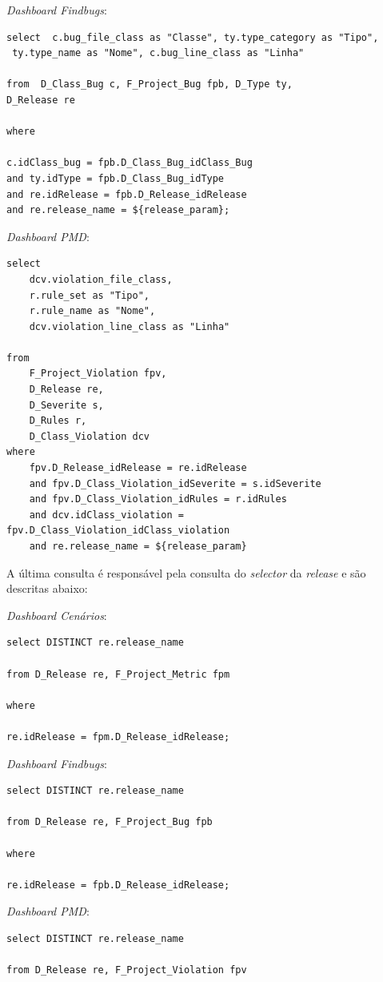 \begin{apendicesenv}
\textit{Dashboard Findbugs}:
{\color{blue}
\begin{verbatim}
select  c.bug_file_class as "Classe", ty.type_category as "Tipo",
 ty.type_name as "Nome", c.bug_line_class as "Linha"

from  D_Class_Bug c, F_Project_Bug fpb, D_Type ty, 
D_Release re

where

c.idClass_bug = fpb.D_Class_Bug_idClass_Bug 
and ty.idType = fpb.D_Class_Bug_idType 
and re.idRelease = fpb.D_Release_idRelease
and re.release_name = ${release_param};
\end{verbatim}
}

\textit{Dashboard PMD}:
{\color{blue}
\begin{verbatim}
select
    dcv.violation_file_class,
	r.rule_set as "Tipo",
	r.rule_name as "Nome",
	dcv.violation_line_class as "Linha"
	
from 
	F_Project_Violation fpv,
	D_Release re,
	D_Severite s,
	D_Rules r,
	D_Class_Violation dcv
where
	fpv.D_Release_idRelease = re.idRelease
	and fpv.D_Class_Violation_idSeverite = s.idSeverite
	and fpv.D_Class_Violation_idRules = r.idRules
	and dcv.idClass_violation = fpv.D_Class_Violation_idClass_violation
	and re.release_name = ${release_param}
\end{verbatim}
}

A última consulta é responsável pela consulta do \textit{selector} da \textit{release} e são descritas abaixo:

\textit{Dashboard Cenários}:
{\color{blue}
\begin{verbatim}
select DISTINCT re.release_name

from D_Release re, F_Project_Metric fpm

where

re.idRelease = fpm.D_Release_idRelease;
\end{verbatim}
}

\textit{Dashboard Findbugs}:
{\color{blue}
\begin{verbatim}
select DISTINCT re.release_name

from D_Release re, F_Project_Bug fpb

where

re.idRelease = fpb.D_Release_idRelease;
\end{verbatim}
}

\textit{Dashboard PMD}:
{\color{blue}
\begin{verbatim}
select DISTINCT re.release_name

from D_Release re, F_Project_Violation fpv


\end{verbatim}}
\end{apendicesenv}
